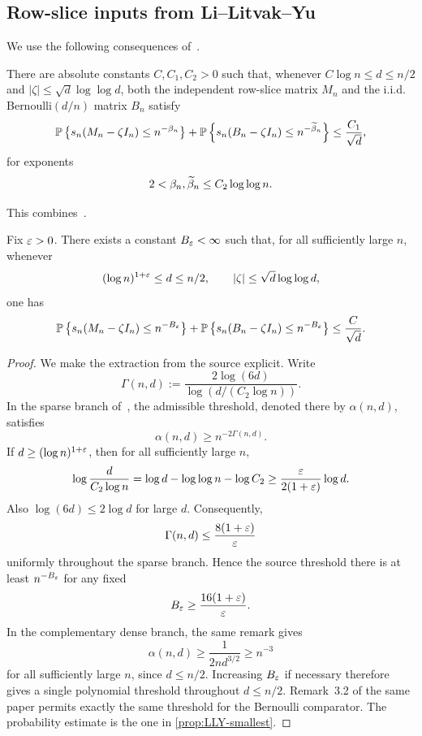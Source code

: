 \subsection{Row-slice inputs from Li--Litvak--Yu}

We use the following consequences of~\cite{LLY26a}.

\begin{proposition}\label{prop:LLY-smallest}
There are absolute constants $C,C_1,C_2>0$ such that, whenever $C\log n\le d\le n/2$ and $|\zeta|\le\sqrt d\log\log d$, both the independent row-slice matrix $M_n$ and the i.i.d. Bernoulli$(d/n)$ matrix $B_n$ satisfy
\[
  \mathbb P\left\{s_n(M_n-\zeta I_n)\le n^{-\beta_n}\right\}
  +\mathbb P\left\{s_n(B_n-\zeta I_n)\le n^{-\widetilde\beta_n}\right\}
  \le\frac{C_1}{\sqrt d},
\]
for exponents
\[
  2<\beta_n,\widetilde\beta_n\le C_2\log\log n.
\]
\end{proposition}

This combines~\cite[Theorem~1.7, Remark~1.9, Theorem~3.1 and Remark~3.2]{LLY26a}.

\begin{corollary}\label{cor:uniform-polynomial}
Fix $\varepsilon>0$. There exists a constant $B_\varepsilon<\infty$ such that, for all sufficiently large $n$, whenever
\[
  (\log n)^{1+\varepsilon}\le d\le n/2,
  \qquad
  |\zeta|\le\sqrt d\log\log d,
\]
one has
\begin{equation}\label{eq:uniform-polynomial}
  \mathbb P\left\{s_n(M_n-\zeta I_n)\le n^{-B_\varepsilon}\right\}
  +\mathbb P\left\{s_n(B_n-\zeta I_n)\le n^{-B_\varepsilon}\right\}
  \le\frac C{\sqrt d}.
\end{equation}
\end{corollary}

\begin{proof}
We make the extraction from the source explicit. Write
\[
  \Gamma(n,d):=\frac{2\log(6d)}{\log(d/(C_2\log n))}.
\]
In the sparse branch of~\cite[Remark~1.9]{LLY26a}, the admissible threshold, denoted there by $\alpha(n,d)$, satisfies
\[
  \alpha(n,d)\ge n^{-2\Gamma(n,d)}.
\]
If $d\ge(\log n)^{1+\varepsilon}$, then for all sufficiently large $n$,
\[
  \log\frac d{C_2\log n}
  =\log d-\log\log n-\log C_2
  \ge\frac{\varepsilon}{2(1+\varepsilon)}\log d.
\]
Also $\log(6d)\le2\log d$ for large $d$. Consequently,
\[
  \Gamma(n,d)\le\frac{8(1+\varepsilon)}{\varepsilon}
\]
uniformly throughout the sparse branch. Hence the source threshold there is at least $n^{-B_\varepsilon}$ for any fixed
\[
  B_\varepsilon\ge\frac{16(1+\varepsilon)}{\varepsilon}.
\]
In the complementary dense branch, the same remark gives
\[
  \alpha(n,d)\ge\frac1{2nd^{3/2}}\ge n^{-3}
\]
for all sufficiently large $n$, since $d\le n/2$. Increasing $B_\varepsilon$ if necessary therefore gives a single polynomial threshold throughout $d\le n/2$. Remark~3.2 of the same paper permits exactly the same threshold for the Bernoulli comparator. The probability estimate is the one in \cref{prop:LLY-smallest}.
\end{proof}

